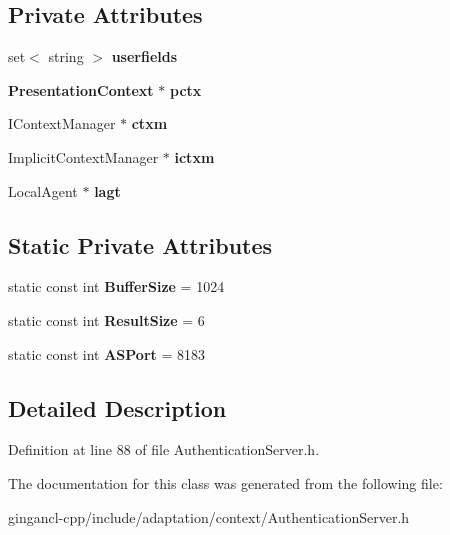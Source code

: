 \subsection*{Private Attributes}
\begin{CompactItemize}
\item 
set$<$ string $>$ {\bf userfields}\label{classbr_1_1pucrio_1_1telemidia_1_1ginga_1_1ncl_1_1adaptation_1_1context_1_1AuthenticationServer_325be17958696612d64ef151fc50854e}

\item 
{\bf PresentationContext} $\ast$ {\bf pctx}\label{classbr_1_1pucrio_1_1telemidia_1_1ginga_1_1ncl_1_1adaptation_1_1context_1_1AuthenticationServer_f7b4b50fbbf7df8416480bc884dd2909}

\item 
IContextManager $\ast$ {\bf ctxm}\label{classbr_1_1pucrio_1_1telemidia_1_1ginga_1_1ncl_1_1adaptation_1_1context_1_1AuthenticationServer_d0c763f78bf175b580deda10b6a9814b}

\item 
ImplicitContextManager $\ast$ {\bf ictxm}\label{classbr_1_1pucrio_1_1telemidia_1_1ginga_1_1ncl_1_1adaptation_1_1context_1_1AuthenticationServer_d504f9183d80b49c6631db333df57e72}

\item 
LocalAgent $\ast$ {\bf lagt}\label{classbr_1_1pucrio_1_1telemidia_1_1ginga_1_1ncl_1_1adaptation_1_1context_1_1AuthenticationServer_513c00acef820b0a7072a370953f3da4}

\end{CompactItemize}
\subsection*{Static Private Attributes}
\begin{CompactItemize}
\item 
static const int {\bf BufferSize} = 1024\label{classbr_1_1pucrio_1_1telemidia_1_1ginga_1_1ncl_1_1adaptation_1_1context_1_1AuthenticationServer_08004bc62105711b520423240e06a5eb}

\item 
static const int {\bf ResultSize} = 6\label{classbr_1_1pucrio_1_1telemidia_1_1ginga_1_1ncl_1_1adaptation_1_1context_1_1AuthenticationServer_be5eccd6d4716a0b6629af3a4351446f}

\item 
static const int {\bf ASPort} = 8183\label{classbr_1_1pucrio_1_1telemidia_1_1ginga_1_1ncl_1_1adaptation_1_1context_1_1AuthenticationServer_8a5b9b91da4dfb3aa543c7ac34af1372}

\end{CompactItemize}


\subsection{Detailed Description}




Definition at line 88 of file AuthenticationServer.h.

The documentation for this class was generated from the following file:\begin{CompactItemize}
\item 
gingancl-cpp/include/adaptation/context/AuthenticationServer.h\end{CompactItemize}
